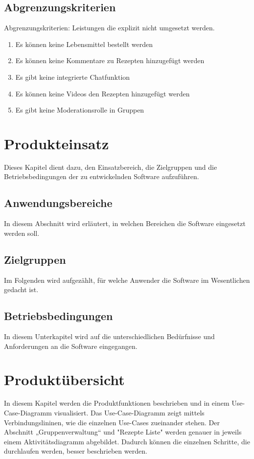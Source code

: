 \documentclass[parskip=full]{scrartcl}
\begin{document}
\subsection{Abgrenzungskriterien}
Abgrenzungskriterien: Leistungen die explizit nicht umgesetzt werden.

\begin{enumerate}[start=1,label={$\langle$\bfseries RW\arabic*$\rangle$}, leftmargin = 5em, itemsep=4pt, parsep=4pt]
    \item Es können keine Lebensmittel bestellt werden
    \item Es können keine Kommentare zu Rezepten hinzugefügt werden
    \item Es gibt keine integrierte Chatfunktion
    \item Es können keine Videos den Rezepten hinzugefügt werden
    \item Es gibt keine Moderationsrolle in Gruppen 
\end{enumerate}

\section{Produkteinsatz}
Dieses Kapitel dient dazu, den Einsatzbereich, die Zielgruppen und die Betriebsbedingungen der zu entwickelnden Software aufzuführen.

\subsection{Anwendungsbereiche}
In diesem Abschnitt wird erläutert, in welchen Bereichen die Software eingesetzt werden soll.

\subsection{Zielgruppen}
Im Folgenden wird aufgezählt, für welche Anwender die Software im Wesentlichen gedacht ist.

\subsection{Betriebsbedingungen}
In diesem Unterkapitel wird auf die unterschiedlichen Bedürfnisse und Anforderungen an die Software eingegangen.

\section{Produktübersicht}
In diesem Kapitel werden die Produktfunktionen beschrieben und in einem Use-Case-Diagramm visualisiert.
Das Use-Case-Diagramm zeigt mittels Verbindungslininen, wie die einzelnen Use-Cases zueinander stehen.
Der Abschnitt „Gruppenverwaltung“ und "Rezepte Liste" werden genauer in jeweils einem Aktivitätsdiagramm abgebildet.
Dadurch können die einzelnen Schritte, die durchlaufen werden, besser beschrieben werden.
\end{document}
